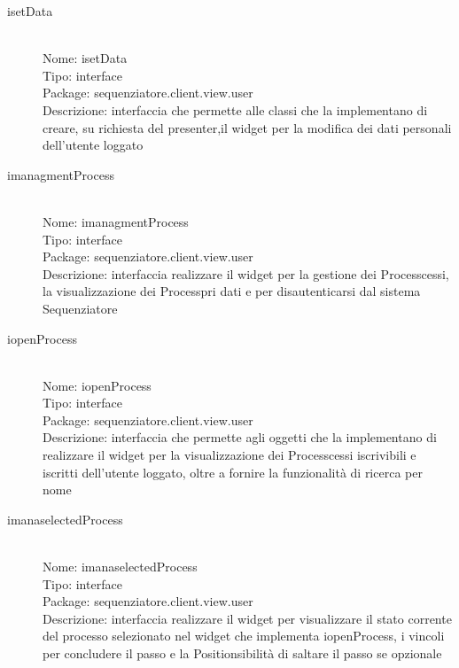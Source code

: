 \begin{description}
	\item[isetData] 
  	\hfill \\
  	Nome: isetData\\
  	Tipo: interface\\
	Package: sequenziatore.client.view.user\\
	Descrizione: interfaccia che permette alle classi che la implementano di creare, su richiesta del presenter,il widget per la modifica dei dati personali dell'utente loggato
\end{description}

\begin{description}
	\item[imanagmentProcess] 
  	\hfill \\
  	Nome: imanagmentProcess\\
  	Tipo: interface\\
	Package: sequenziatore.client.view.user\\
	Descrizione: interfaccia realizzare il widget per la gestione dei Processcessi, la visualizzazione dei Processpri dati e per disautenticarsi dal sistema Sequenziatore
\end{description}

\begin{description}
	\item[iopenProcess] 
  	\hfill \\
  	Nome: iopenProcess\\
  	Tipo: interface\\
	Package: sequenziatore.client.view.user\\
	Descrizione: interfaccia che permette agli oggetti che la implementano di realizzare il widget per la visualizzazione dei Processcessi iscrivibili e iscritti dell'utente loggato, oltre a fornire la funzionalità di ricerca per nome
\end{description}

\begin{description}
	\item[imanaselectedProcess] 
  	\hfill \\
  	Nome: imanaselectedProcess\\
  	Tipo: interface\\
	Package: sequenziatore.client.view.user\\
	Descrizione: interfaccia realizzare il widget per visualizzare il stato corrente del processo selezionato nel widget che implementa iopenProcess, i vincoli per concludere il passo e la Positionsibilità di saltare il passo se opzionale
\end{description}

